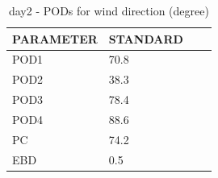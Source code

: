 \begin{table}[p!]
\begin{center}
\begin{tabular}{|l|l|l|l|}
\hline
\multicolumn{1}{|c|}{\cellcolor[HTML]{C0C0C0}\textbf{PARAMETER}} & \multicolumn{1}{c|}{\cellcolor[HTML]{C0C0C0}\textbf{STANDARD}}\\
\hline
\cellcolor[HTML]{C0C0C0}POD1  & 70.8      \\
\cellcolor[HTML]{C0C0C0}POD2  & 38.3      \\
\cellcolor[HTML]{C0C0C0}POD3  & 78.4      \\
\cellcolor[HTML]{C0C0C0}POD4  & 88.6      \\
\cellcolor[HTML]{C0C0C0}PC    & 74.2        \\
\cellcolor[HTML]{C0C0C0}EBD   & 0.5       \\
\hline
\end{tabular}
\caption{day2 - PODs for wind direction (degree)}
\label{tab:podwd:day2}
\end{center}
\end{table}

